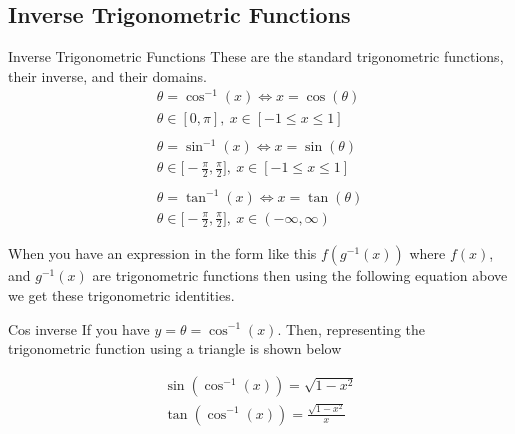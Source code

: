 \documentclass[letterpaper,10pt,twoside,twocolumn,openany]{book}
\begin{document}
\subsection{Inverse Trigonometric Functions}
\begin{paperbox}{Inverse Trigonometric Functions}
    These are the standard trigonometric functions, their inverse, and their domains.
    \begin{gather}
        \theta = \cos^{-1}(x) \Leftrightarrow x = \cos(\theta)\\ 
        \nonumber
        \theta\in [0,\pi],\ x\in[-1\leq x\leq 1]
        \nonumber\\
        \nonumber~\\  
        \theta = \sin^{-1}(x) \Leftrightarrow x = \sin(\theta)\\
        \nonumber
        \theta\in \biggl[-\frac{\pi}{2},\frac{\pi}{2}\biggl],\ x\in[-1\leq x\leq 1]
        \nonumber\\
        \nonumber~\\
        \theta = \tan^{-1}(x) \Leftrightarrow x = \tan(\theta)\\ 
        \nonumber
        \theta\in \biggl[-\frac{\pi}{2},\frac{\pi}{2}\biggl],\ x\in(-\infty, \infty)
    \end{gather}
\end{paperbox}
\newpage
When you have an expression in the form like this $f(g^{-1}(x))$ where $f(x)$, and $g^{-1}(x)$ are trigonometric functions then using the following equation above we get these trigonometric identities.

\begin{commentbox}{Cos inverse}
    If you have
    $
        y = \theta = \cos^{-1}(x)
    $.
    Then, representing the trigonometric function using a triangle is shown below\\
    \begin{gather}
        \sin(\cos^{-1}(x)) = \sqrt{1-x^2}\\
        \tan(\cos^{-1}(x)) = \frac{\sqrt{1-x^2}}{x}
    \end{gather}
\end{commentbox}
\end{document}
